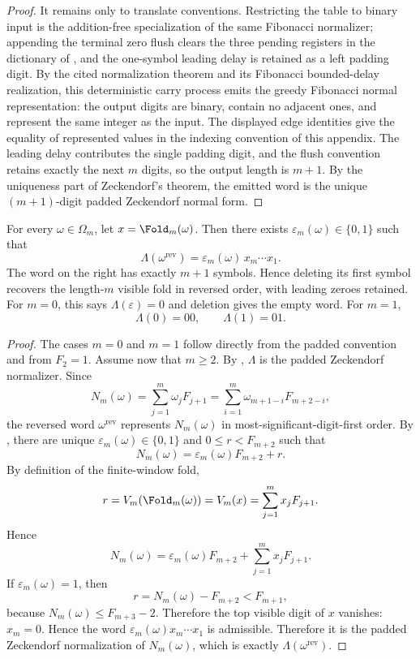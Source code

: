 \begin{proof}
It remains only to translate conventions.  Restricting the table to binary
input is the addition-free specialization of the same Fibonacci normalizer;
appending the terminal zero flush clears the three pending registers in the
dictionary of , and the one-symbol
leading delay is retained as a left padding digit.  By the cited normalization
theorem and its Fibonacci bounded-delay realization, this deterministic carry
process emits the greedy Fibonacci normal representation: the output digits are
binary, contain no adjacent ones, and represent the same integer as the input.
The displayed edge identities give the equality of represented values in the
indexing convention of this appendix.  The leading delay contributes the single
padding digit, and the flush convention retains exactly the next \(m\) digits,
so the output length is \(m+1\).
By the uniqueness part of Zeckendorf's theorem, the emitted word is the unique
\((m+1)\)-digit padded Zeckendorf normal form.
\end{proof}

\begin{theorem}
\label{thm:appendix-fixed-width-overflow}
For every \(\omega\in\Omega_m\), let \(x=\Fold_m(\omega)\).  Then there exists
\(\varepsilon_m(\omega)\in\{0,1\}\) such that
\[
  \Lambda(\omega^{\mathrm{rev}})
  =
  \varepsilon_m(\omega)\,x_m\cdots x_1.
\]
The word on the right has exactly \(m+1\) symbols.  Hence deleting its first
symbol recovers the length-\(m\) visible fold in reversed order, with leading
zeroes retained.  For \(m=0\), this says
\(\Lambda(\varepsilon)=0\) and deletion gives the empty word.  For \(m=1\),
\[
  \Lambda(0)=00,
  \qquad
  \Lambda(1)=01.
\]
\end{theorem}

\begin{proof}
The cases \(m=0\) and \(m=1\) follow directly from the padded convention and
from \(F_2=1\).  Assume now that \(m\ge2\).  By
, \(\Lambda\) is the padded
Zeckendorf normalizer.  Since
\[
  N_m(\omega)
  =
  \sum_{j=1}^m \omega_jF_{j+1}
  =
  \sum_{i=1}^m \omega_{m+1-i}F_{m+2-i},
\]
the reversed word \(\omega^{\mathrm{rev}}\) represents \(N_m(\omega)\) in
most-significant-digit-first order.  By , there are
unique \(\varepsilon_m(\omega)\in\{0,1\}\) and \(0\le r<F_{m+2}\) such that
\[
  N_m(\omega)
  =
  \varepsilon_m(\omega)F_{m+2}+r
  .
\]
By definition of the finite-window fold,
\[
  r=V_m(\Fold_m(\omega))=V_m(x)=\sum_{j=1}^m x_jF_{j+1}.
\]
Hence
\[
  N_m(\omega)
  =
  \varepsilon_m(\omega)F_{m+2}+\sum_{j=1}^m x_jF_{j+1}.
\]
If \(\varepsilon_m(\omega)=1\), then
\[
  r=N_m(\omega)-F_{m+2}<F_{m+1},
\]
because \(N_m(\omega)\le F_{m+3}-2\).  Therefore the top visible digit of
\(x\) vanishes: \(x_m=0\).  Hence the word
\(\varepsilon_m(\omega)x_m\cdots x_1\) is admissible.
Therefore it is the padded Zeckendorf normalization of \(N_m(\omega)\), which is
exactly \(\Lambda(\omega^{\mathrm{rev}})\).
\end{proof}

